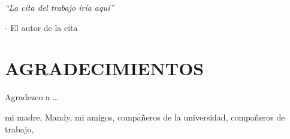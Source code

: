\documentclass[a4paper, 12pt, spanish, twoside]{article}
\newcommand\blankpage{%
    \null
    \thispagestyle{empty}%
    \newpage}
\begin{document}




\newpage
\thispagestyle{empty}

\begin{flushright} %
\vspace*{5cm} %

\textit{“La cita del trabajo iría aquí”} 

\medskip %
- El autor de la cita 

\end{flushright}

\clearpage
\afterpage{\blankpage} %





\newpage
\thispagestyle{plain}

\section*{AGRADECIMIENTOS} %

Agradezco a \dots

mi madre,
Mandy,
mi amigos,
compañeros de la universidad,
compañeros de trabajo,
\end{document}
